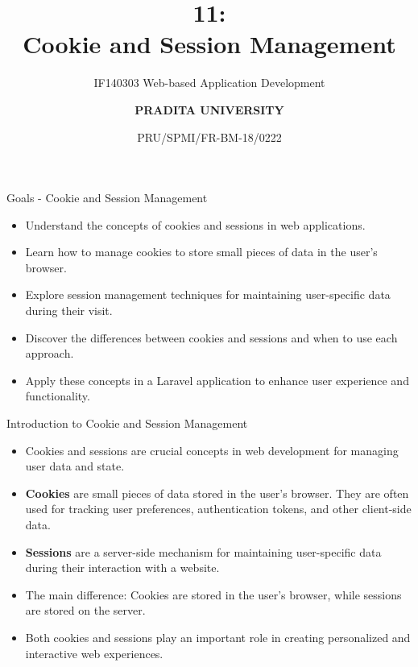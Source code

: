 \documentclass[aspectratio=169, table]{beamer}
\subtitle{IF140303 Web-based Application Development}
\title{\Huge {\textbf{11: \\Cookie and Session Management}}}
\date[Serial]{\scriptsize {PRU/SPMI/FR-BM-18/0222}}
\author[Pradita]{\small {\textbf{PRADITA UNIVERSITY}}}
\begin{document}
\begin{frame}
    \titlepage
\end{frame}

\begin{frame}{Goals - Cookie and Session Management}
\vskip1cm
    \begin{itemize}
        \item Understand the concepts of cookies and sessions in web applications.
        \item Learn how to manage cookies to store small pieces of data in the user's browser.
        \item Explore session management techniques for maintaining user-specific data during their visit.
        \item Discover the differences between cookies and sessions and when to use each approach.
        \item Apply these concepts in a Laravel application to enhance user experience and functionality.
    \end{itemize}
\end{frame}

\begin{frame}{Introduction to Cookie and Session Management}
    \vskip1cm
    \begin{itemize}
        \item Cookies and sessions are crucial concepts in web development for managing user data and state.
        \item \textbf{Cookies} are small pieces of data stored in the user's browser. They are often used for tracking user preferences, authentication tokens, and other client-side data.
        \item \textbf{Sessions} are a server-side mechanism for maintaining user-specific data during their interaction with a website.
        \item The main difference: Cookies are stored in the user's browser, while sessions are stored on the server.
        \item Both cookies and sessions play an important role in creating personalized and interactive web experiences.
    \end{itemize}
\end{frame}
\end{document}
